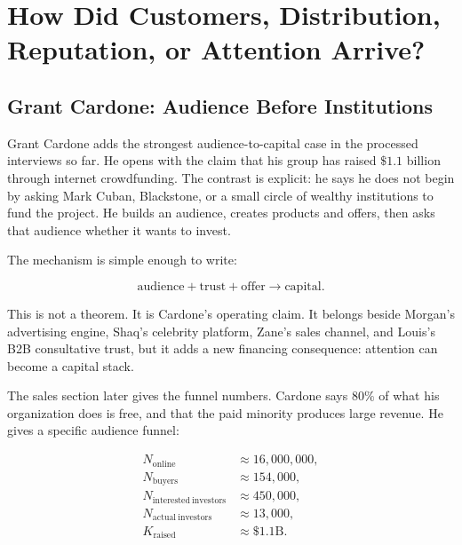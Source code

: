 \documentclass[11pt,oneside]{book}
\begin{document}
\chapter{How Did Customers, Distribution, Reputation, or Attention Arrive?}

\section{Grant Cardone: Audience Before Institutions}

Grant Cardone adds the strongest audience-to-capital case in the processed interviews so far. He opens with the claim that his group has raised \(\$1.1\) billion through internet crowdfunding. The contrast is explicit: he says he does not begin by asking Mark Cuban, Blackstone, or a small circle of wealthy institutions to fund the project. He builds an audience, creates products and offers, then asks that audience whether it wants to invest.

The mechanism is simple enough to write:

\begin{equation}
\mathrm{audience}+\mathrm{trust}+\mathrm{offer}
\longrightarrow
\mathrm{capital}.
\end{equation}

This is not a theorem. It is Cardone's operating claim. It belongs beside Morgan's advertising engine, Shaq's celebrity platform, Zane's sales channel, and Louis's B2B consultative trust, but it adds a new financing consequence: attention can become a capital stack.

The sales section later gives the funnel numbers. Cardone says \(80\%\) of what his organization does is free, and that the paid minority produces large revenue. He gives a specific audience funnel:

\begin{align}
N_{\mathrm{online}} &\approx 16{,}000{,}000,\\
N_{\mathrm{buyers}} &\approx 154{,}000,\\
N_{\mathrm{interested\ investors}} &\approx 450{,}000,\\
N_{\mathrm{actual\ investors}} &\approx 13{,}000,\\
K_{\mathrm{raised}} &\approx \$1.1\mathrm{B}.
\end{align}
\end{document}
